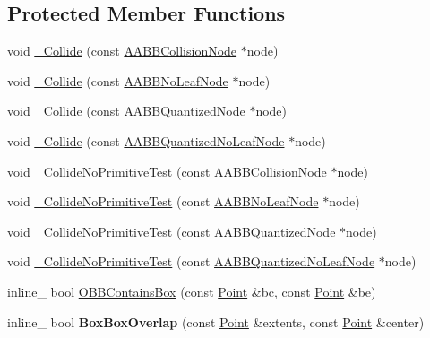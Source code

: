 \subsection*{Protected Member Functions}
\begin{DoxyCompactItemize}
\item 
void \hyperlink{classOpcode_1_1OBBCollider_a7990bab5c0031bcb1f9ff91e0784fb89}{\+\_\+\+Collide} (const \hyperlink{classOpcode_1_1AABBCollisionNode}{A\+A\+B\+B\+Collision\+Node} $\ast$node)
\item 
void \hyperlink{classOpcode_1_1OBBCollider_a8a0b06aac794cf0beeaf2f4655319f2b}{\+\_\+\+Collide} (const \hyperlink{classOpcode_1_1AABBNoLeafNode}{A\+A\+B\+B\+No\+Leaf\+Node} $\ast$node)
\item 
void \hyperlink{classOpcode_1_1OBBCollider_a9b112aeac7f0ec4475a7257359c038d7}{\+\_\+\+Collide} (const \hyperlink{classOpcode_1_1AABBQuantizedNode}{A\+A\+B\+B\+Quantized\+Node} $\ast$node)
\item 
void \hyperlink{classOpcode_1_1OBBCollider_a03ade2e5058bc111c4595a1bfc2001bb}{\+\_\+\+Collide} (const \hyperlink{classOpcode_1_1AABBQuantizedNoLeafNode}{A\+A\+B\+B\+Quantized\+No\+Leaf\+Node} $\ast$node)
\item 
void \hyperlink{classOpcode_1_1OBBCollider_a452f93a41ae9e7d0fa1b691cdf149841}{\+\_\+\+Collide\+No\+Primitive\+Test} (const \hyperlink{classOpcode_1_1AABBCollisionNode}{A\+A\+B\+B\+Collision\+Node} $\ast$node)
\item 
void \hyperlink{classOpcode_1_1OBBCollider_a17db250fb7683f36dec64773d347a759}{\+\_\+\+Collide\+No\+Primitive\+Test} (const \hyperlink{classOpcode_1_1AABBNoLeafNode}{A\+A\+B\+B\+No\+Leaf\+Node} $\ast$node)
\item 
void \hyperlink{classOpcode_1_1OBBCollider_a0914b34907f08b5e7861737e10de573c}{\+\_\+\+Collide\+No\+Primitive\+Test} (const \hyperlink{classOpcode_1_1AABBQuantizedNode}{A\+A\+B\+B\+Quantized\+Node} $\ast$node)
\item 
void \hyperlink{classOpcode_1_1OBBCollider_a2b02ebe38b171892c5b8372171b8a7bc}{\+\_\+\+Collide\+No\+Primitive\+Test} (const \hyperlink{classOpcode_1_1AABBQuantizedNoLeafNode}{A\+A\+B\+B\+Quantized\+No\+Leaf\+Node} $\ast$node)
\item 
inline\+\_\+ bool \hyperlink{classOpcode_1_1OBBCollider_a5cfea10cee5411ceb83f811a7d75ac47}{O\+B\+B\+Contains\+Box} (const \hyperlink{classOpcode_1_1Point}{Point} \&bc, const \hyperlink{classOpcode_1_1Point}{Point} \&be)
\item 
inline\+\_\+ bool {\bfseries Box\+Box\+Overlap} (const \hyperlink{classOpcode_1_1Point}{Point} \&extents, const \hyperlink{classOpcode_1_1Point}{Point} \&center)\hypertarget{classOpcode_1_1OBBCollider_aa36909e6ee05fb7d22ff8dde22b394ce}{}\label{classOpcode_1_1OBBCollider_aa36909e6ee05fb7d22ff8dde22b394ce}


\end{DoxyCompactItemize}
